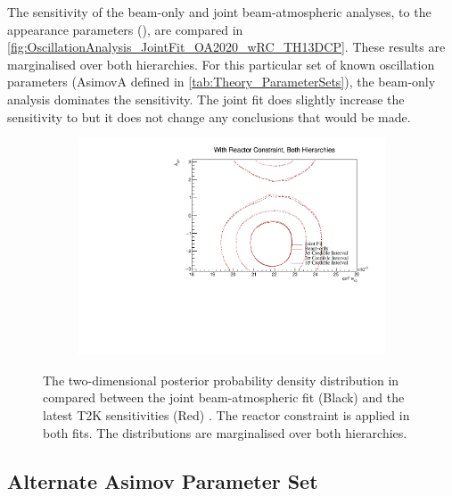 The sensitivity of the beam-only and joint beam-atmospheric analyses, to the appearance parameters (), are compared in \autoref{fig:OscillationAnalysis_JointFit_OA2020_wRC_TH13DCP}. These results are marginalised over both hierarchies. For this particular set of known oscillation parameters (AsimovA defined in \autoref{tab:Theory_ParameterSets}), the beam-only analysis dominates the sensitivity. The joint fit does slightly increase the sensitivity to  but it does not change any conclusions that would be made.

\begin{figure}[h]
  \begin{subfigure}[t]{0.98\textwidth}
    \includegraphics[width=\textwidth, trim={0mm 0mm 0mm 0mm}, clip,page=1]{Figures/OA/JointFit_OA2020_wRC_Comp/ContourComparison_2D_th13_dcp_BH_1_wRC_UnSmeared_CredibleInterval.pdf}
  \end{subfigure}
  \caption{The two-dimensional posterior probability density distribution in  compared between the joint beam-atmospheric fit (Black) and the latest T2K sensitivities (Red) \cite{Dunne2020-uf, t2k_tn_393}. The reactor constraint is applied in both fits. The distributions are marginalised over both hierarchies.}
  \label{fig:OscillationAnalysis_JointFit_OA2020_wRC_TH13DCP}
\end{figure}

\clearpage
\subsection{Alternate Asimov Parameter Set}
\label{sec:OscillationAnalysis_AsimovB}

